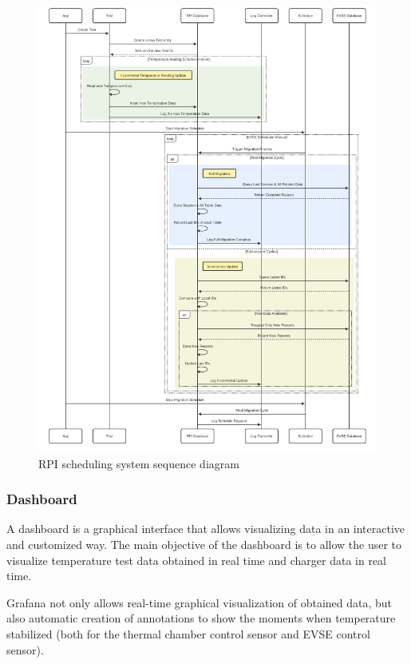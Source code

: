 \begin{figure}[H]
    \centering
    \includegraphics[scale=0.10]{figures/scheduling_2.pdf}
    \caption{RPI scheduling system sequence diagram}
    \label{fig:scheduling_2}
\end{figure}

\subsubsection{Dashboard}
A dashboard is a graphical interface that allows visualizing data in an interactive and customized way. The main objective of the dashboard is to allow the user to visualize temperature test data obtained in real time and charger data in real time.

Grafana not only allows real-time graphical visualization of obtained data, but also automatic creation of annotations to show the moments when temperature stabilized (both for the thermal chamber control sensor and EVSE control sensor).

